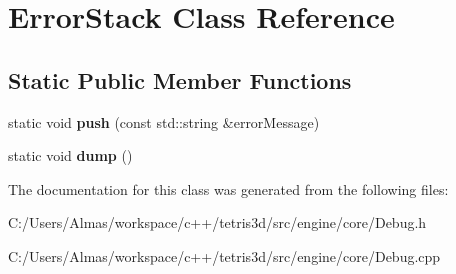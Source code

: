\hypertarget{class_error_stack}{\section{Error\-Stack Class Reference}
\label{class_error_stack}
}
\subsection*{Static Public Member Functions}
\begin{DoxyCompactItemize}
\item 
\hypertarget{class_error_stack_a99b06ba9e289f90de420b5ab11ab6f10}{static void {\bfseries push} (const std\-::string \&error\-Message)}\label{class_error_stack_a99b06ba9e289f90de420b5ab11ab6f10}

\item 
\hypertarget{class_error_stack_af65fca9a503d19b7e4253948bd2dd205}{static void {\bfseries dump} ()}\label{class_error_stack_af65fca9a503d19b7e4253948bd2dd205}

\end{DoxyCompactItemize}


The documentation for this class was generated from the following files\-:\begin{DoxyCompactItemize}
\item 
C\-:/\-Users/\-Almas/workspace/c++/tetris3d/src/engine/core/Debug.\-h\item 
C\-:/\-Users/\-Almas/workspace/c++/tetris3d/src/engine/core/Debug.\-cpp\end{DoxyCompactItemize}
